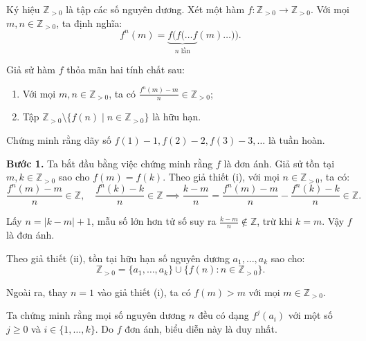 \ifshowproblemandsoln
\ifshowproblem\begin{problem}\label{problem:IMO-2015-SL-P6}\fi
\ifshowsoln\begin{problem}\fi
    Ký hiệu \( \mathbb{Z}_{>0} \) là tập các số nguyên dương.  
    Xét một hàm \( f: \mathbb{Z}_{>0} \to \mathbb{Z}_{>0} \). Với mọi \( m, n \in \mathbb{Z}_{>0} \), ta định nghĩa:
    \[
        f^n(m) = \underbrace{f(f(\ldots f}_{n \text{ lần}}(m)\ldots)).
    \]

    Giả sử hàm \( f \) thỏa mãn hai tính chất sau:
    \begin{enumerate}[topsep=0pt, partopsep=0pt, itemsep=0pt, label=(\roman*)]
        \item Với mọi \( m, n \in \mathbb{Z}_{>0} \), ta có \( \frac{f^n(m) - m}{n} \in \mathbb{Z}_{>0} \);  
        \item Tập \( \mathbb{Z}_{>0} \setminus \{ f(n) \mid n \in \mathbb{Z}_{>0} \} \) là hữu hạn.
    \end{enumerate}

    Chứng minh rằng dãy số \( f(1) - 1, f(2) - 2, f(3) - 3, \ldots \) là tuần hoàn.
\end{problem}
\fi

\ifshowsoln
\begin{soln}\footnotemark
    \textbf{Bước 1.} Ta bắt đầu bằng việc chứng minh rằng \( f \) là đơn ánh. Giả sử tồn tại \( m, k \in \mathbb{Z}_{>0} \) sao cho \( f(m) = f(k) \).
    Theo giả thiết (i), với mọi \( n \in \mathbb{Z}_{>0} \), ta có:
    \[
        \frac{f^n(m) - m}{n} \in \mathbb{Z}, \quad \frac{f^n(k) - k}{n} \in \mathbb{Z}
        \implies
        \frac{k - m}{n} = \frac{f^n(m) - m}{n} - \frac{f^n(k) - k}{n} \in \mathbb{Z}.
    \]
    
    Lấy \( n = |k - m| + 1 \), mẫu số lớn hơn tử số suy ra \( \frac{k - m}{n} \notin \mathbb{Z} \), trừ khi \( k = m \). Vậy \( f \) là đơn ánh.

    Theo giả thiết (ii), tồn tại hữu hạn số nguyên dương \( a_1, \ldots, a_k \) sao cho:
    \[
        \mathbb{Z}_{>0} = \{ a_1, \ldots, a_k \} \cup \{ f(n) : n \in \mathbb{Z}_{>0} \}.
    \]
    
    Ngoài ra, thay \( n = 1 \) vào giả thiết (i), ta có \( f(m) > m \) với mọi \( m \in \mathbb{Z}_{>0} \).

    Ta chứng minh rằng mọi số nguyên dương \( n \) đều có dạng \( f^j(a_i) \) với một số \( j \ge 0 \) và \( i \in \{1, \ldots, k\} \).
    Do \( f \) đơn ánh, biểu diễn này là duy nhất.


\end{soln}
\end{problem}
